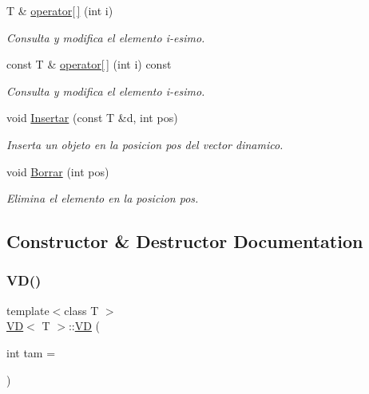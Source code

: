 \begin{DoxyCompactItemize}
T \& \hyperlink{class_v_d_a021495b46a5b59c7fd1e25653ab8f824}{operator\mbox{[}$\,$\mbox{]}} (int i)
\begin{DoxyCompactList}\small\item\em Consulta y modifica el elemento i-\/esimo. \end{DoxyCompactList}\item 
const T \& \hyperlink{class_v_d_ab0c8adba584dcbb2f07171dedcfc395e}{operator\mbox{[}$\,$\mbox{]}} (int i) const
\begin{DoxyCompactList}\small\item\em Consulta y modifica el elemento i-\/esimo. \end{DoxyCompactList}\item 
void \hyperlink{class_v_d_aded65b5f02cceb9780303afd5c88acb8}{Insertar} (const T \&d, int pos)
\begin{DoxyCompactList}\small\item\em Inserta un objeto en la posicion pos del vector dinamico. \end{DoxyCompactList}\item 
void \hyperlink{class_v_d_a13528c6fae34510d10699f426de88e27}{Borrar} (int pos)
\begin{DoxyCompactList}\small\item\em Elimina el elemento en la posicion pos. \end{DoxyCompactList}\end{DoxyCompactItemize}


\subsection{Constructor \& Destructor Documentation}
\mbox{\label{class_v_d_a1ce73549d14f68caecaa593de3255c30}} 
\subsubsection{\texorpdfstring{V\+D()}{VD()}\hspace{0.1cm}{\footnotesize\ttfamily [1/2]}}
{\footnotesize\ttfamily template$<$class T $>$ \\
\hyperlink{class_v_d}{VD}$<$ T $>$\+::\hyperlink{class_v_d}{VD} (\begin{DoxyParamCaption}\item[{int}]{tam = {} }\end{DoxyParamCaption})}



